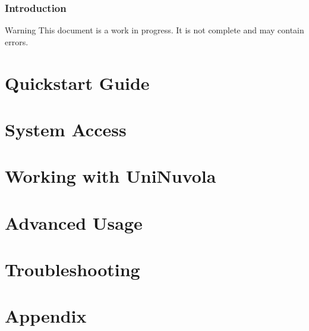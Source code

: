\documentclass[a4paper,11pt]{article}
\begin{document}


\tableofcontents
\newpage

\section*{Introduction}

\begin{bclogo}[logo=\bcinfo, couleurBarre=orange, noborder=true, couleur=white]{Warning}
    This document is a work in progress. It is not complete and may contain errors.
\end{bclogo}



\pagebreak
\part{Quickstart Guide}


\pagebreak
\part{System Access}

\pagebreak
\part{Working with UniNuvola}


\pagebreak
\part{Advanced Usage}


\pagebreak
\part{Troubleshooting}


\pagebreak
\part{Appendix}

\end{document}
